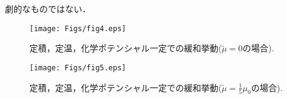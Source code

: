 劇的なものではない．
\begin{figure}[h]
	\begin{center}
	\texttt{[image: Figs/fig4.eps]} 
	\end{center}
	\caption{
		定積，定温，化学ポテンシャル一定での緩和挙動($\tilde \mu =0$の場合).
	} 
	\label{fig:fig4}
\end{figure}
\begin{figure}[h]
	\begin{center}
	\texttt{[image: Figs/fig5.eps]} 
	\end{center}
	\caption{
		定積，定温，化学ポテンシャル一定での緩和挙動($\tilde \mu =\frac{1}{5}\mu_0 $の場合).
	} 
	\label{fig:fig5}
\end{figure}
